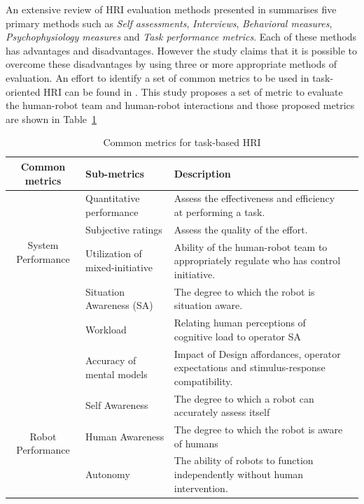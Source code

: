 {An extensive review of HRI evaluation methods presented in \cite{bethel2010review} summarises five primary methods such as \emph{Self assessments}, \emph{Interviews}, \emph{Behavioral measures}, \emph{Psychophysiology measures} and \emph{Task performance metrics}. Each of these methods has advantages and disadvantages. However the study claims that it is possible to overcome these disadvantages by using three or more appropriate methods of evaluation. An effort to identify a set of common metrics to be used in task-oriented HRI can be found in \cite{Steinfeld2006}. This study proposes a set of metric to evaluate the human-robot team and human-robot interactions and those proposed metrics are shown in Table~\ref{table:hri_metrics}
\begin{table}[H]
\centering
\small
\caption{Common metrics for task-based HRI}
\label{table:hri_metrics}
\begin{tabularx}{400pt}{c*3{X}}
\toprule
  \textbf{Common metrics} & \textbf{Sub-metrics} 
                          & \textbf{Description}
  \tabularnewline \midrule
  
  \multirow{4}{*}{System Performance} & Quantitative performance & Assess the effectiveness and efficiency at performing a task. \\
                                      & Subjective ratings & Assess the quality of the effort. \\
                                      & Utilization of mixed-initiative & Ability of the human-robot team to appropriately regulate who has control initiative. 
                                          \tabularnewline\midrule
                                          
  \multirow{4}{*}{Operator Performance} & Situation Awareness (SA) & The degree to which the robot is situation aware. \\
                                        & Workload & Relating human perceptions of cognitive load to operator SA \\
                                        & Accuracy of mental models & Impact of Design affordances, operator expectations and stimulus-response compatibility.
                                          \tabularnewline\midrule
  
  \multirow{4}{*}{Robot Performance}  & Self Awareness & The degree to which a robot can accurately assess itself \\
                                      & Human Awareness & The degree to which the robot is aware of humans \\
                                      & Autonomy & The ability of robots to function independently without human intervention.
                                          \tabularnewline                                
                                         

\end{tabularx}
\end{table}}

